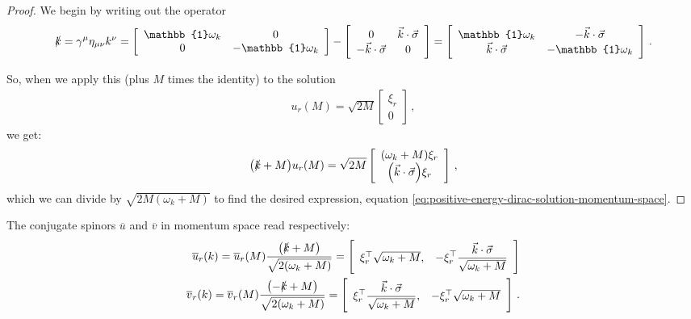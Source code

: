 \documentclass[main.tex]{subfiles}
\begin{document}
\begin{proof}
We begin by writing out the operator 
%
\begin{align}
\slashed{k}  = \gamma^{\mu } \eta_{\mu \nu } k^{\nu }
= \left[\begin{array}{cc}
\mathbb{1} \omega_{k} & 0 \\ 
0 & -\mathbb{1} \omega_{k}
\end{array}\right]
- 
\left[\begin{array}{cc}
0 & \vec{k} \cdot \vec{\sigma} \\ 
-\vec{k} \cdot \vec{\sigma} & 0
\end{array}\right]
= \left[\begin{array}{cc}
\mathbb{1} \omega_{k} & -\vec{k} \cdot \vec{\sigma} \\ 
\vec{k} \cdot \vec{\sigma} & - \mathbb{1} \omega_{k}
\end{array}\right]
\,.
\end{align}

So, when we apply this (plus \(M\) times the identity) to the solution 
%
\begin{align}
u_r(M) = \sqrt{2M} \left[\begin{array}{c}
\xi_{r} \\ 
0
\end{array}\right]
\,,
\end{align}
%
we get: 
%
\begin{align}
\qty(\slashed{k} + M) u_{r}(M) = 
\sqrt{2M} \left[\begin{array}{c}
\qty(\omega_{k} + M)  \xi_{r} \\ 
\qty(\vec{k} \cdot \vec{\sigma}) \xi_{r}
\end{array}\right]
\,,
\end{align}
%
which we can divide by \(\sqrt{2M (\omega_{k} + M)}\) to find the desired expression, equation \eqref{eq:positive-energy-dirac-solution-momentum-space}.
\end{proof}

\begin{claim}
The conjugate spinors \(\overline{u}\) and \(\overline{v}\) in momentum space read respectively: 
%
\begin{align}
\overline{u}_{r} (k) = \overline{u}_{r}(M) \frac{\qty(\slashed{k} + M)}{\sqrt{2 (\omega_{k} + M)}}
= \left[\begin{array}{cc}
\xi_{r}^{\top} \sqrt{\omega_{k} + M}, & 
\displaystyle
- \xi_{r}^{\top} \frac{\vec{k} \cdot \vec{\sigma}}{\sqrt{\omega_{k} + M}}
\end{array}\right] \\
\overline{v}_{r} (k) = \overline{v}_{r}(M) \frac{\qty(-\slashed{k} + M)}{\sqrt{2 (\omega_{k} + M)}}
= \left[\begin{array}{cc}
\displaystyle
\xi_{r}^{\top} \frac{\vec{k} \cdot \vec{\sigma}}{\sqrt{\omega_{k} + M}}, &
-\xi_{r}^{\top} \sqrt{\omega_{k} + M}
\end{array}\right]
\,.
\end{align}
\end{claim}
\end{document}

